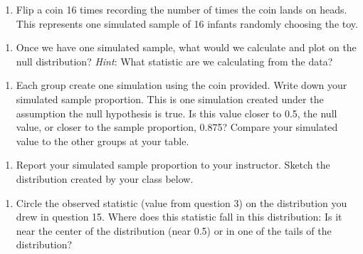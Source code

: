 \documentclass[
]{report}
\providecommand{\tightlist}{%
  \setlength{\itemsep}{0pt}\setlength{\parskip}{0pt}}
\begin{document}
\vspace{0.2in}

\begin{enumerate}
\def\labelenumi{\arabic{enumi}.}
\setcounter{enumi}{11}
\tightlist
\item
  Flip a coin 16 times recording the number of times the coin lands on heads. This represents one simulated sample of 16 infants randomly choosing the toy.
\end{enumerate}

\vspace{0.3in}

\begin{enumerate}
\def\labelenumi{\arabic{enumi}.}
\setcounter{enumi}{12}
\tightlist
\item
  Once we have one simulated sample, what would we calculate and plot on the null distribution? \emph{Hint}: What statistic are we calculating from the data?
\end{enumerate}

\vspace{0.5in}

\begin{enumerate}
\def\labelenumi{\arabic{enumi}.}
\setcounter{enumi}{13}
\tightlist
\item
  Each group create one simulation using the coin provided. Write down your simulated sample proportion. This is one simulation created under the assumption the null hypothesis is true. Is this value closer to 0.5, the null value, or closer to the sample proportion, 0.875? Compare your simulated value to the other groups at your table.
\end{enumerate}

\vspace{0.8in}

\begin{enumerate}
\def\labelenumi{\arabic{enumi}.}
\setcounter{enumi}{14}
\tightlist
\item
  Report your simulated sample proportion to your instructor. Sketch the distribution created by your class below.
\end{enumerate}

\vspace{1.5in}

\begin{enumerate}
\def\labelenumi{\arabic{enumi}.}
\setcounter{enumi}{15}
\tightlist
\item
  Circle the observed statistic (value from question 3) on the distribution you drew in question 15. Where does this statistic fall in this distribution: Is it near the center of the distribution (near 0.5) or in one of the tails of the distribution?
\end{enumerate}
\end{document}
